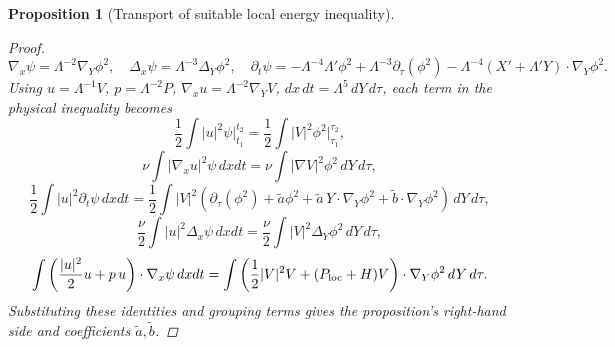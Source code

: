 \documentclass[11pt]{amsart}
\theoremstyle{plain}
\newtheorem{proposition}[theorem]{Proposition}
\theoremstyle{definition}
\theoremstyle{remark}
\begin{document}
\begin{proposition}[Transport of suitable local energy inequality]
\begin{proof}
\[
\nabla_x\psi=\Lambda^{-2}\nabla_Y\phi^2,\quad
\Delta_x\psi=\Lambda^{-3}\Delta_Y\phi^2,\quad
\partial_t\psi
=-\Lambda^{-4}\Lambda'\phi^2+\Lambda^{-3}\partial_\tau(\phi^2)-\Lambda^{-4}(X'+\Lambda'Y)\cdot\nabla_Y\phi^2.
\]
Using \(u=\Lambda^{-1}V\), \(p=\Lambda^{-2}P\), \(\nabla_xu=\Lambda^{-2}\nabla_YV\),
\(dx\,dt=\Lambda^{5}\,dY\,d\tau\), each term in the physical inequality becomes
\[
\frac12\int |u|^2\psi\big|_{t_1}^{t_2}
=\frac12\int |V|^2\phi^2\big|_{\tau_1}^{\tau_2},
\]
\[
\nu\int |\nabla_xu|^2\psi\,dxdt
=\nu\int |\nabla V|^2\phi^2\,dY\,d\tau,
\]
\[
\frac12\int |u|^2\partial_t\psi\,dxdt
=\frac12\int |V|^2\left(\partial_\tau(\phi^2)+\tilde a\phi^2+\tilde a\,Y\cdot\nabla_Y\phi^2+\tilde b\cdot\nabla_Y\phi^2\right)\,dY\,d\tau,
\]
\[
\frac{\nu}{2}\int |u|^2\Delta_x\psi\,dxdt
=\frac{\nu}{2}\int |V|^2\Delta_Y\phi^2\,dY\,d\tau,
\]
\[
\int\left(\frac{|u|^2}{2}u+p\,u\right)\cdot\nabla_x\psi\,dxdt
=\int\left(\frac12|V|^2V+(P_{\rm loc}+H)V\right)\cdot\nabla_Y\phi^2\,dY\,d\tau.
\]
Substituting these identities and grouping terms gives the proposition's right-hand
side and coefficients \(\tilde a,\tilde b\).
\end{proof}
\end{proposition}
\end{document}
